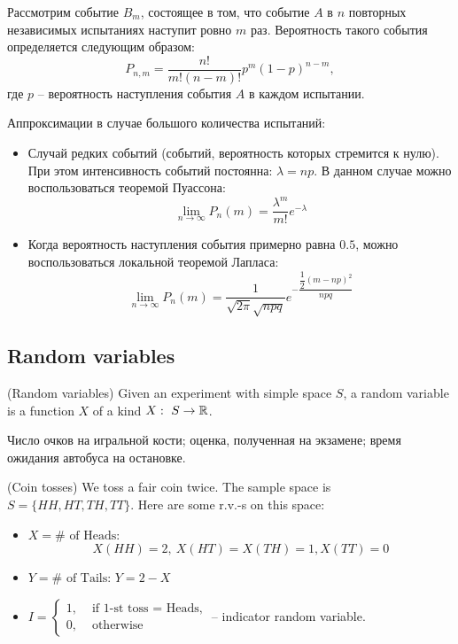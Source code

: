 Рассмотрим событие $B_m$, состоящее в том, что событие $A$ в $n $ повторных независимых испытаниях наступит ровно $m$ раз. Вероятность такого события определяется следующим образом:
\[
    P_{n, m} = \dfrac{n!}{m!(n-m)!}p^m(1-p)^{n-m},  
\]
где $p$ -- вероятность наступления события $A$ в каждом испытании.

\par
Аппроксимации в случае большого количества испытаний:
\begin{itemize}
    \item Случай редких событий (событий, вероятность которых стремится к нулю). При этом интенсивность событий постоянна: $\lambda = np$. В данном случае можно воспользоваться теоремой Пуассона:
    \[
        \lim\limits_{n\to \infty} P_n(m) = \dfrac{\lambda^m}{m!}e^{-\lambda}  
    \]
    \item Когда вероятность наступления события примерно равна $0.5$, можно воспользоваться локальной теоремой Лапласа:
    \[
        \lim\limits_{n\to \infty} P_n(m) = \dfrac{1}{\sqrt{2\pi}\sqrt{npq}}e^{\displaystyle - \dfrac{\dfrac{1}{2}\left(m - np\right)^2}{npq}}
    \]
\end{itemize}

\subsection*{Random variables}
\begin{definition}{(Random variables)}{}
    Given an experiment with simple space $S$, a random variable is a function $X$ of a kind $X: \ S \to \mathbb{R}$.
\end{definition}
\Ex Число очков на игральной кости; оценка, полученная на экзамене; время ожидания автобуса на остановке.

\example (Coin tosses) We toss a fair coin twice. The sample space is $S = \{HH, HT, TH, TT\}$. Here are some r.v.-s on this space:
\begin{itemize}
    \item $X = \# \text{ of Heads}$:
    \[
        X(HH) = 2, \ X(HT) = X(TH) = 1, X(TT) = 0  
    \]
    \item $Y = \# \text{ of Tails}$: $Y = 2 - X$
    \item $I = \left\{
        \begin{array}{ll}
            1, & \text{ if 1-st toss = Heads},\\
            0, & \text{ otherwise}
        \end{array}
    \right.$ -- indicator random variable.
\end{itemize}
